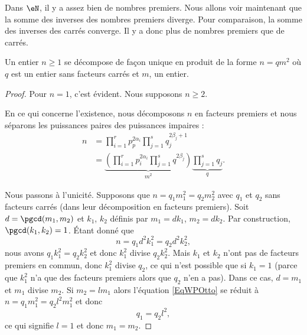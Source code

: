 Dans \( \eN\), il y a assez bien de nombres premiers. Nous allons voir maintenant que la somme des inverses des nombres premiers diverge. Pour comparaison, la somme des inverses des carrés converge. Il y a donc plus de nombres premiers que de carrés.
\begin{lemma}   \label{LemheKdsa}
    Un entier \( n\geq 1\) se décompose de façon unique en produit de la forme \( n=qm^2\) où \( q\) est un entier sans facteurs carrés et \( m\), un entier.
\end{lemma}

\begin{proof}
    Pour \( n=1\), c'est évident. Nous supposons \( n\geq 2\).

    En ce qui concerne l'existence, nous décomposons \( n\) en facteurs premiers et nous séparons les puissances paires des puissances impaires :
    \begin{subequations}
        \begin{align}
            n&=\prod_{i=1}^rp_p^{2\alpha_i}\prod_{j=1}^sq_{j}^{2\beta_j+1}\\
            &=\underbrace{\left( \prod_{i=1}^rp_i^{2\alpha_i}\prod_{j=1}^sq^{2\beta_j} \right)}_{m^2}\underbrace{\prod_{j=1}^sq_j}_{q}.
        \end{align}
    \end{subequations}
    
    Nous passons à l'unicité. Supposons que \( n=q_1m_1^2=q_2m_2^2\) avec \( q_1\) et \( q_2\) sans facteurs carrés (dans leur décomposition en facteurs premiers). Soit \( d=\pgcd(m_1,m_2)\) et \( k_1\), \( k_2\) définis par \( m_1=dk_1\), \( m_2=dk_2\). Par construction, \( \pgcd(k_1,k_2)=1\). Étant donné que
    \begin{equation}        \label{EqWPOtto}
        n=q_1d^2k_1^2=q_2d^2k_2^2,
    \end{equation}
    nous avons \( q_1k_1^2=q_2k_2^2\) et donc \( k_1^2\) divise \( q_2k_2^2\). Mais \( k_1\) et \( k_2\) n'ont pas de facteurs premiers en commun, donc \( k_1^2\) divise \( q_2\), ce qui n'est possible que si \( k_1=1\) (parce que \( k_1^2\) n'a que des facteurs premiers alors que \( q_2\) n'en a pas). Dans ce cas, \( d=m_1\) et \( m_1\) divise \( m_2\). Si \( m_2=lm_1\) alors l'équation \eqref{EqWPOtto} se réduit à  \( n=q_1m_1^2=q_2l^2m_1^2\) et donc
    \begin{equation}
        q_1=q_2l^2,
    \end{equation}
    ce qui signifie \( l=1\) et donc \( m_1=m_2\).

\end{proof}

